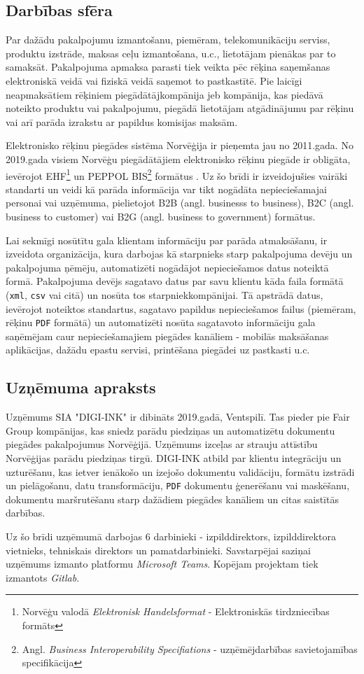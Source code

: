 \subsection{Darbības sfēra}
\par Par dažādu pakalpojumu izmantošanu, piemēram, telekomunikāciju serviss, produktu izstrāde, maksas ceļu izmantošana, u.c., lietotājam pienākas par to samaksāt. Pakalpojuma apmaksa parasti tiek veikta pēc rēķina saņemšanas elektroniskā veidā vai fiziskā veidā saņemot to pastkastītē. Pie laicīgi neapmaksātiem rēķiniem piegādātājkompānija jeb kompānija, kas piedāvā noteikto produktu vai pakalpojumu, piegādā lietotājam atgādinājumu par rēķinu vai arī parāda izrakstu ar papildus komisijas maksām.
\par Elektronisko rēķinu piegādes sistēma Norvēģija ir pieņemta jau no 2011.gada. No 2019.gada visiem Norvēģu piegādātājiem elektronisko rēķinu piegāde ir obligāta, ievērojot EHF\footnote{Norvēģu valodā \textit{Elektronisk Handelsformat} - Elektroniskās tirdzniecības formāts} un PEPPOL BIS\footnote{Angl. \textit{Business Interoperability Specifiations} - uzņēmējdarbības savietojamības specifikācija} formātus \cite{eInvoicingNorway}. Uz šo brīdi ir izveidojušies vairāki standarti un veidi kā parāda informācija var tikt nogādāta nepieciešamajai personai vai uzņēmuma, pielietojot B2B (angl. businesss to business), B2C (angl. business to customer) vai B2G (angl. business to government) formātus.
\par Lai sekmīgi nosūtītu gala klientam informāciju par parāda atmaksāšanu, ir izveidota organizācija, kura darbojas kā starpnieks starp pakalpojuma devēju un pakalpojuma ņēmēju, automatizēti nogādājot nepieciešamos datus noteiktā formā. Pakalpojuma devējs sagatavo datus par savu klientu kāda faila formātā (\texttt{xml}, \texttt{csv} vai citā) un nosūta tos starpniekkompānijai. Tā apstrādā datus, ievērojot noteiktos standartus, sagatavo papildus nepieciešamos failus (piemēram, rēķinu \texttt{PDF} formātā) un automatizēti nosūta sagatavoto informāciju gala saņēmējam caur nepieciešamajiem piegādes kanāliem - mobilās maksāšanas aplikācijas, dažādu epastu servisi, printēšana piegādei uz pastkasti u.c.
\subsection{Uzņēmuma apraksts}
Uzņēmums SIA "DIGI-INK" ir dibināts 2019.gadā, Ventspilī. Tas pieder pie Fair Group kompānijas, kas sniedz parādu piedziņas un automatizētu dokumentu piegādes pakalpojumus Norvēģijā. Uzņēmums izceļas ar strauju attīstību Norvēģijas parādu piedziņas tirgū.
DIGI-INK atbild par klientu integrāciju un uzturēšanu, kas ietver ienākošo un izejošo dokumentu validāciju, formātu izstrādi un pielāgošanu, datu transformāciju, \texttt{PDF} dokumentu ģenerēšanu vai maskēšanu, dokumentu maršrutēšanu starp dažādiem piegādes kanāliem un citas saistītās darbības.
\par Uz šo brīdi uzņēmumā darbojas 6 darbinieki - izpilddirektors, izpilddirektora vietnieks, tehniskais direktors un pamatdarbinieki. Savstarpējai saziņai uzņēmums izmanto platformu \textit{Microsoft Teams}. Kopējam projektam tiek izmantots \textit{Gitlab}.

